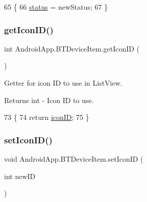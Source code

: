 \begin{DoxyCode}
65                                             \{
66         \hyperlink{class_android_app_1_1_b_t_device_item_a53c37efab7ea4550d4db428b3d6915e0}{status} = newStatus;
67     \}
\end{DoxyCode}
\mbox{\label{class_android_app_1_1_b_t_device_item_a42c00ce200fd487f51e2016ed65cdf22}} 
\subsubsection{\texorpdfstring{get\+Icon\+I\+D()}{getIconID()}}
{\footnotesize\ttfamily int Android\+App.\+B\+T\+Device\+Item.\+get\+Icon\+ID (\begin{DoxyParamCaption}{ }\end{DoxyParamCaption})\hspace{0.3cm}{\ttfamily [inline]}}



Getter for icon ID to use in List\+View. 

\begin{DoxyReturn}{Returns}
int -\/ Icon ID to use. 
\end{DoxyReturn}

\begin{DoxyCode}
73                            \{
74         \textcolor{keywordflow}{return} \hyperlink{class_android_app_1_1_b_t_device_item_aa008dfacbd2f948952a14bed413d5969}{iconID};
75     \}
\end{DoxyCode}
\mbox{\label{class_android_app_1_1_b_t_device_item_a893140b78c17184a199ac419f0fc7be7}} 
\subsubsection{\texorpdfstring{set\+Icon\+I\+D()}{setIconID()}}
{\footnotesize\ttfamily void Android\+App.\+B\+T\+Device\+Item.\+set\+Icon\+ID (\begin{DoxyParamCaption}\item[{int}]{new\+ID }\end{DoxyParamCaption})\hspace{0.3cm}{\ttfamily [inline]}}



